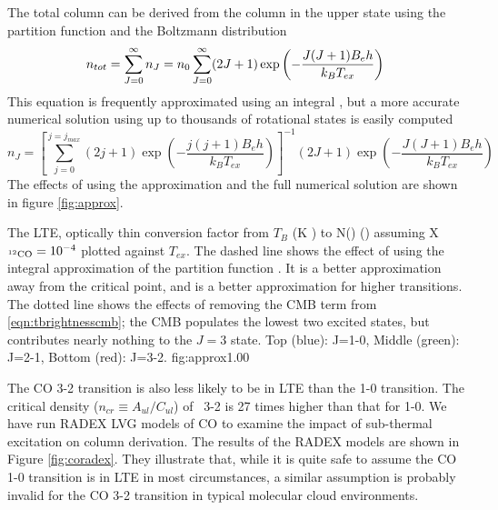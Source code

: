 The total column can be derived from the column in the upper state using the partition
function and the Boltzmann distribution
\begin{equation}
  n_{tot}  =        \sum_{J=0}^\infty n_J = n_0 \sum_{J=0}^\infty  (2J+1) \exp\left(-\frac{J(J+1) B_e h}{k_B T_{ex}}\right) \label{eqn:approxpartition}\\
\end{equation}
This equation is frequently approximated using an integral
\citep[e.g.][]{Cabrit1990}, but a more accurate numerical solution using up to
thousands of rotational states is easily computed
\begin{equation}
  n_J = \left[ \sum_{j=0}^{j=j_{max}} (2j+1) \exp\left(-\frac{j(j+1) B_e h}{k_B T_{ex}}\right) \right]^{-1} (2J+1) \exp\left(-\frac{J(J+1) B_e h}{k_B T_{ex}}\right)
\end{equation}
The effects of using the approximation and the full numerical solution are shown in figure \ref{fig:approx}.


{The LTE, optically thin conversion factor from $T_B$ (K \kms) to N(\hh)
(\persc) assuming X$_{^{12}\textrm{CO}}=10^{-4}$ plotted against $T_{ex}$.  The
dashed line shows the effect of using the integral approximation of the 
partition function \citep[e.g.][]{Cabrit1990}.  It is a better
approximation away from the critical point, and is a better approximation
for higher transitions.  The dotted line shows the effects of removing the 
CMB term from \eqref{eqn:tbrightnesscmb}; the CMB populates the lowest two
excited states, but contributes nearly nothing to the $J=3$ state. Top (blue):
J=1-0, Middle (green): J=2-1, Bottom (red): J=3-2.}
{fig:approx}{1.0}{0}


The CO 3-2 transition is also less likely to be in LTE than the 1-0 transition.
The critical density ($n_{cr}\equiv A_{ul}/C_{ul}$) of \twelveco\ 3-2 is 27
times higher than that for 1-0.  We have run RADEX \citep{VanDerTak2007} LVG
models of CO to examine the impact of sub-thermal excitation on column
derivation.  The results of the RADEX models are shown in Figure
\ref{fig:coradex}.  They illustrate that, while it is quite safe to assume the
CO 1-0 transition is in LTE in most circumstances, a similar assumption is
probably invalid for the CO 3-2 transition in typical molecular cloud
environments.


